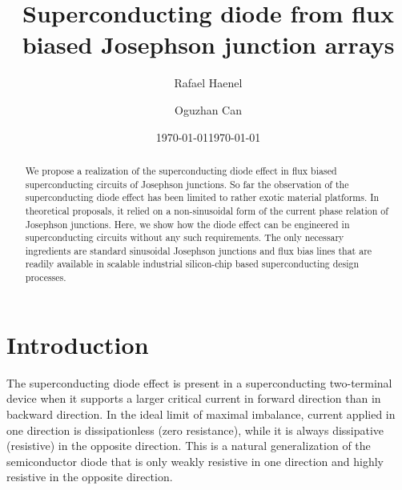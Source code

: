 \documentclass[aps,rsi,reprint,amsmath,amssymb,floatfix,longbibliography,superscriptaddress]{revtex4-1}
\begin{document}
\title{Superconducting diode from flux biased Josephson junction
arrays}

\author{Rafael Haenel}

\author{Oguzhan Can}






\date{\today}

%
\begin{abstract}
	We propose a realization of the superconducting diode effect in flux biased superconducting circuits of Josephson junctions. So far the observation of the superconducting diode effect has been limited to 
	rather	
	exotic material platforms. In theoretical proposals, it relied on a non-sinusoidal form of the current phase relation of Josephson junctions.
	Here, we show how the diode effect can be engineered in
superconducting circuits without any such requirements. The only necessary ingredients are standard sinusoidal Josephson junctions and flux bias lines that are readily available in scalable industrial silicon-chip based superconducting design processes.

\end{abstract}

\date{\today}
\maketitle

\section{Introduction}

The superconducting diode effect is present in a  superconducting two-terminal device when it supports a larger critical current in forward direction than in backward direction.
In the ideal limit of maximal imbalance, current applied in one direction is
dissipationless (zero resistance), while it is always dissipative (resistive) in the opposite direction. This
is a natural generalization of the semiconductor diode that is only weakly
resistive in one direction and highly resistive in the opposite direction.
\end{document}
